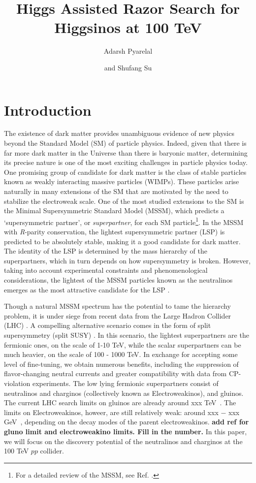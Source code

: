 \documentclass[a4paper,11pt]{article}
\title{Higgs Assisted Razor Search for Higgsinos at 100 TeV}
\author[a]{Adarsh Pyarelal}
\author[b]{and Shufang Su}
\affiliation[a]{School of Information, University of Arizona, Tucson, AZ 85718 , USA}
\affiliation[b]{Department of Physics, University of Arizona, Tucson, AZ 85718, USA}
\newcommand{\Shufang}[1]{{\bf\color{Maroon}  #1}}
\begin{document}
 
\maketitle
\flushbottom

\section{Introduction}
 
The existence of dark matter provides unambiguous evidence of new 
physics beyond the Standard Model (SM) of particle physics. Indeed, 
given that there is far more dark matter in the Universe than there 
is baryonic matter, determining its precise nature is one of the most 
exciting challenges in particle physics today.  One promising group 
of candidate for dark matter is the class of stable particles known as 
weakly interacting massive particles (WIMPs). These particles arise 
naturally in many extensions of the SM that are motivated by the need to
stabilize the electroweak scale. One of the most studied extensions
to the SM is the Minimal Supersymmetric Standard Model
(MSSM), which predicts a `supersymmetric partner', or \emph{superpartner}, 
for each SM particle\footnote{For a detailed review of the MSSM, see 
Ref. \citep{Martin:1997ns}.}. In the MSSM with \emph{R}-parity conservation, the 
lightest supersymmetric partner (LSP) is predicted to be absolutely 
stable, making it a good candidate for dark matter. The identity of 
the LSP is determined by the mass hierarchy of the superpartners, 
which in turn depends on how supersymmetry is broken.
However, taking into account experimental constraints and phenomenological 
considerations, the lightest of the  MSSM particles known as the 
neutralinos emerges as the most attractive candidate for the LSP \citep{Bertone:2004pz}. 

Though a natural MSSM spectrum has the potential to tame the hierarchy
problem, it is under siege from recent data from the Large Hadron
Collider (LHC) \cite{Aaboud:2018ujj, Sirunyan:2018vjp}. 
A compelling alternative scenario comes in the form of
split supersymmetry (split SUSY) \citep{Wells:2003tf,
ArkaniHamed:2004yi, Giudice:2004tc}. In this scenario, the lightest
superpartners are the fermionic ones, on the
scale of 1-10 TeV, while the scalar superpartners can be much heavier,
on the scale of 100 - 1000 TeV. In exchange for accepting some level of
fine-tuning, we obtain numerous benefits, including the suppression of
flavor-changing neutral currents and greater compatibility with data
from CP-violation experiments.  The low lying 
fermionic superpartners consist of neutralinos and charginos (collectively known as Electroweakinos), and gluinos. The current LHC search limits on gluinos are already around xxx TeV~\cite{}.  The limits on Electroweakinos, howeer, are still relatively weak: around xxx $-$ xxx GeV~\cite{}, depending on the decay modes of the parent electroweakinos.  \Shufang{add ref for gluno limit and electroweakino limits.  Fill in the number.} In this paper, we will focus on the discovery potential of the neutralinos and charginos at the 100 TeV $pp$ collider. 
\end{document}

